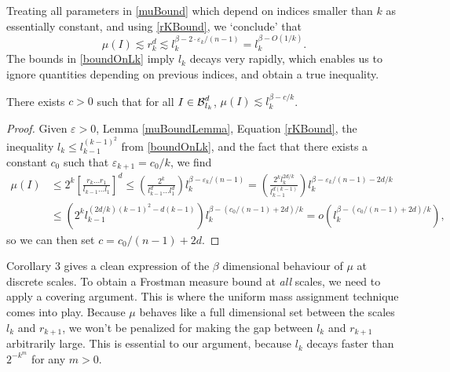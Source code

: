 Treating all parameters in \eqref{muBound} which depend on indices smaller than $k$ as essentially constant, and using \eqref{rKBound}, we `conclude' that
%
\[ \mu(I) \lesssim r_k^d \lesssim l_k^{\beta - 2 \cdot \varepsilon_k / (n-1)} = l_k^{\beta - O(1/k)}. \]
%
The bounds in \eqref{boundOnLk} imply $l_k$ decays very rapidly, which enables us to ignore quantities depending on previous indices, and obtain a true inequality.

\begin{corollary}
	There exists $c > 0$ such that for all $I \in \operatorname{\mathcal{B}}^d_{l_k}$, $\mu(I) \lesssim l_k^{\beta - c/k}$.
\end{corollary}
\begin{proof}
	Given $\varepsilon > 0$, Lemma \ref{muBoundLemma}, Equation \eqref{rKBound}, the inequality $l_k \leq l_{k-1}^{(k-1)^2}$ from \eqref{boundOnLk}, and the fact that there exists a constant $c_0$ such that $\varepsilon_{k+1} = c_0/k$, we find
	\begin{align*}
		\mu(I) &\leq 2^k \left[ \frac{r_k \dots r_1}{l_{k-1} \dots l_1} \right]^d \leq \left( \frac{2^k}{l_{k-1}^d \dots l_1^d} \right) l_k^{\beta - \varepsilon_k / (n-1)} = \left( \frac{2^k l_k^{2d/k}}{l_{k-1}^{d(k-1)}} \right) l_k^{\beta - \varepsilon_k/(n-1) - 2d/k}\\
		&\leq \left( 2^k l_{k-1}^{(2d/k)(k-1)^2 - d(k-1)} \right) l_k^{\beta - (c_0/(n-1) + 2d)/k} = o \left(l_k^{\beta - (c_0/(n-1) + 2d)/k} \right), %
	\end{align*}
	so we can then set $c = c_0/(n-1) + 2d$.
\end{proof}

Corollary 3 gives a clean expression of the $\beta$ dimensional behaviour of $\mu$ at discrete scales. To obtain a Frostman measure bound at {\it all} scales, we need to apply a covering argument. This is where the uniform mass assignment technique comes into play. Because $\mu$ behaves like a full dimensional set between the scales $l_k$ and $r_{k+1}$, we won't be penalized for making the gap between $l_k$ and $r_{k+1}$ arbitrarily large. This is essential to our argument, because $l_k$ decays faster than $2^{-k^m}$ for any $m > 0$.

